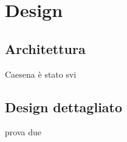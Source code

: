\section{Design}
\subsection{Architettura}
Caesena è stato svi
\subsection{Design dettagliato}
prova due